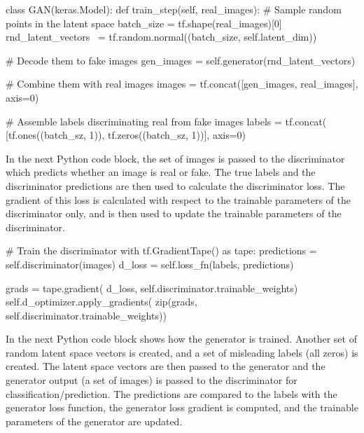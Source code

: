 \begin{pythoncode}
class GAN(keras.Model):
    def train_step(self, real_images):
        # Sample random points in the latent space
        batch_size = tf.shape(real_images)[0]
        rnd_latent_vectors \
            = tf.random.normal((batch_size, self.latent_dim))

        # Decode them to fake images
        gen_images = self.generator(rnd_latent_vectors)

        # Combine them with real images
        images = tf.concat([gen_images, real_images], axis=0)

        # Assemble labels discriminating real from fake images
        labels = tf.concat(
            [tf.ones((batch_sz, 1)), 
            tf.zeros((batch_sz, 1))], axis=0)
\end{pythoncode}

In the next Python code block, the set of images is passed to the discriminator which predicts whether an image is real or fake. The true labels and the discriminator predictions are then used to calculate the discriminator loss. The gradient of this loss is calculated with respect to the trainable parameters of the discriminator only, and is then used to update the trainable parameters of the discriminator.

\begin{pythoncode}
        # Train the discriminator
        with tf.GradientTape() as tape:
            predictions = self.discriminator(images)
            d_loss = self.loss_fn(labels, predictions)
            
        grads = tape.gradient(
            d_loss, 
            self.discriminator.trainable_weights)
        self.d_optimizer.apply_gradients(
            zip(grads, self.discriminator.trainable_weights))
\end{pythoncode}

In the next Python code block shows how the generator is trained. Another set of random latent space vectors is created, and a set of misleading labels (all zeros) is created. The latent space vectors are then passed to the generator and the generator output (a set of images) is passed to the discriminator for classification/prediction. The predictions are compared to the labels with the generator loss function, the generator loss gradient is computed, and the trainable parameters of the generator are updated.


